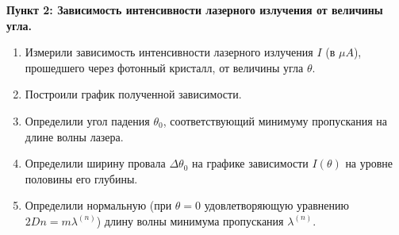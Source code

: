 \documentclass[a4paper, 12pt]{article}
\begin{document}
\textbf{Пункт 2: Зависимость интенсивности лазерного излучения от величины угла.}
	\begin{enumerate}
\item Измерили зависимость интенсивности лазерного излучения $I$ (в $\mu A$), прошедшего через фотонный кристалл, от величины угла $\theta$.
\item Построили график полученной зависимости.
\item Определили угол падения $\theta_0$, соответствующий минимуму пропускания на длине волны лазера.
\item Определили ширину провала $\Delta \theta_0$ на графике зависимости $I(\theta)$ на уровне половины его глубины.
\item Определили нормальную (при $\theta=0$ удовлетворяющую уравнению $2Dn=m\lambda^{(n)}$) длину волны минимума пропускания $\lambda^{(n)}$.
	\end{enumerate}
\end{document}

